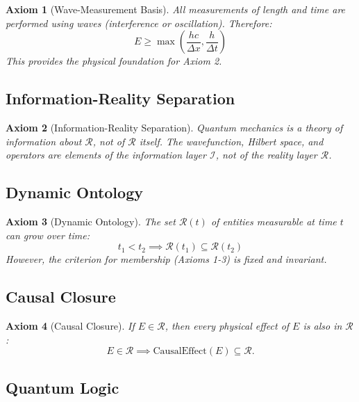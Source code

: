 \documentclass[aps,preprint,showpacs,showkeys]{revtex4}%
\newtheorem{axiom}{Axiom}
\begin{document}
\begin{axiom}[Wave-Measurement Basis]
All measurements of length and time are performed using waves (interference
or oscillation). Therefore: 
\begin{equation}
E \ge \max\left(\frac{hc}{\Delta x}, \frac{h}{\Delta t}\right)
\end{equation}
This provides the physical foundation for Axiom 2.
\end{axiom}

\subsection{Information-Reality Separation}

\begin{axiom}[Information-Reality Separation]
Quantum mechanics is a theory of \emph{information about} $\mathcal{R}$, not
of $\mathcal{R}$ itself. The wavefunction, Hilbert space, and operators are
elements of the information layer $\mathcal{I}$, not of the reality layer $%
\mathcal{R}$.
\end{axiom}

\subsection{Dynamic Ontology}

\begin{axiom}[Dynamic Ontology]
The set $\mathcal{R}(t)$ of entities measurable at time $t$ can grow over
time: 
\begin{equation}
t_1 < t_2 \implies \mathcal{R}(t_1) \subseteq \mathcal{R}(t_2)
\end{equation}
However, the criterion for membership (Axioms 1-3) is fixed and invariant.
\end{axiom}

\subsection{Causal Closure}

\begin{axiom}[Causal Closure]
If $E \in \mathcal{R}$, then every physical effect of $E$ is also in $%
\mathcal{R}$: 
\begin{equation}
E \in \mathcal{R} \implies \text{CausalEffect}(E) \subseteq \mathcal{R}.
\end{equation}
\end{axiom}

\subsection{Quantum Logic}
\end{document}
